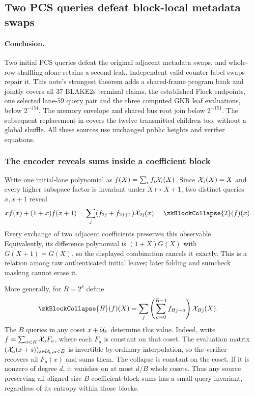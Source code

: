 \subsection{Two PCS queries defeat block-local metadata swaps}\label{note:zk-flock-pair-opening}

\paragraph{Conclusion.} Two initial PCS queries defeat the original adjacent metadata swaps, and whole-row shuffling alone retains a second leak. Independent valid counter-label swaps repair it. This note's strongest theorem adds a shared-frame program bank and jointly covers all $37$ BLAKE2s terminal claims, the established Flock endpoints, one selected lane-$59$ query pair and the three computed GKR leaf evaluations, below $2^{-154}$. The memory envelope and shared bus root join below $2^{-151}$. The subsequent replacement in  covers the twelve transmitted children too, without a global shuffle. All these sources use unchanged public heights and verifier equations.

\subsubsection{The encoder reveals sums inside a coefficient block}

Write one initial-lane polynomial as $f(X)=\sum_i f_i\mathcal{X}_i(X)$. Since $\mathcal{X}_1(X)=X$ and every higher subspace factor is invariant under $X\mapsto X+1$, two distinct queries $x,x+1$ reveal
\[
 x f(x)+(1+x)f(x+1)
 =\sum_j(f_{2j}+f_{2j+1})\novel_{2j}(x)
 =\zkBlockCollapse{2}(f)(x).
\]
Every exchange of two adjacent coefficients preserves this observable. Equivalently, its difference polynomial is $(1+X)G(X)$ with $G(X+1)=G(X)$, so the displayed combination cancels it exactly. This is a relation among raw authenticated initial leaves; later folding and sumcheck masking cannot erase it.

More generally, for $B=2^k$ define
\[
 \zkBlockCollapse{B}(f)(X)
 =\sum_j\left(\sum_{a=0}^{B-1}f_{Bj+a}\right)\novel_{Bj}(X).
\]
The $B$ queries in any coset $x+\mathcal{U}_k$ determine this value. Indeed, write $f=\sum_{a<B}\mathcal{X}_a F_a$, where each $F_a$ is constant on that coset. The evaluation matrix $(\mathcal{X}_a(x+s))_{s\in\mathcal{U}_k,a<B}$ is invertible by ordinary interpolation, so the verifier recovers all $F_a(x)$ and sums them. The collapse is constant on the coset. If it is nonzero of degree $d$, it vanishes on at most $d/B$ whole cosets. Thus any source preserving all aligned size-$B$ coefficient-block sums has a small-query invariant, regardless of its entropy within those blocks.


